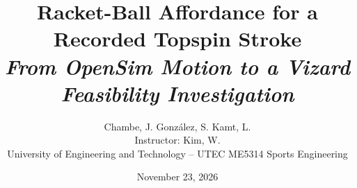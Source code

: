 \title{\textbf{Racket-Ball Affordance for a Recorded Topspin Stroke}\\[3pt]
    \large\itshape From OpenSim Motion to a Vizard Feasibility Investigation}
\author{Chambe, J. \quad Gonz\'alez, S. \quad Kamt, L.\\[2pt]
    \small Instructor: Kim, W.\\
    \small University of Engineering and Technology -- UTEC \quad ME5314 Sports Engineering}
\date{November 23, 2026}
\maketitle
\thispagestyle{plain}
